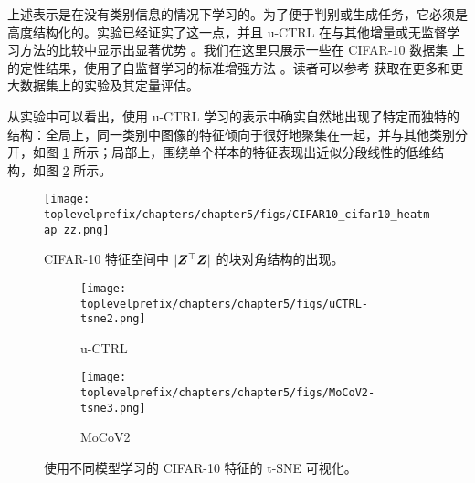 \documentclass[../../book-main.tex]{subfiles}
\begin{document}
上述表示是在没有类别信息的情况下学习的。为了便于判别或生成任务，它必须是高度结构化的。实验已经证实了这一点，并且 u-CTRL 在与其他增量或无监督学习方法的比较中显示出显著优势 \cite{pmlr-v234-tong24a}。我们在这里只展示一些在 CIFAR-10 数据集 \cite{krizhevsky2014cifar} 上的定性结果，使用了自监督学习的标准增强方法 \cite{chen2020simple}。读者可以参考 \cite{pmlr-v234-tong24a} 获取在更多和更大数据集上的实验及其定量评估。

从实验中可以看出，使用 u-CTRL 学习的表示中确实自然地出现了特定而独特的结构：全局上，同一类别中图像的特征倾向于很好地聚集在一起，并与其他类别分开，如图 \ref{fig:heatmap_z} 所示；局部上，围绕单个样本的特征表现出近似分段线性的低维结构，如图 \ref{fig:tsne} 所示。

\begin{figure}[t]
     \footnotesize
     \centering
    \texttt{[image: \\toplevelprefix/chapters/chapter5/figs/CIFAR10\_cifar10\_heatmap\_zz.png]}
    \caption{\small CIFAR-10 特征空间中 $|\bm{Z}^\top \bm{Z}|$ 的块对角结构的出现。}
    \label{fig:heatmap_z}
\end{figure}

\begin{figure}[h!]
    \begin{subfigure}[t]{0.46\textwidth}
        \centering
        \texttt{[image: \\toplevelprefix/chapters/chapter5/figs/uCTRL-tsne2.png]}
        \caption{u-CTRL}
    \end{subfigure}
    \hfill
    \begin{subfigure}[t]{0.46\textwidth}
        \centering
        \texttt{[image: \\toplevelprefix/chapters/chapter5/figs/MoCoV2-tsne3.png]}
        \caption{MoCoV2}
    \end{subfigure}
    \caption{\small 使用不同模型学习的 CIFAR-10 特征的 t-SNE 可视化。} 
    \label{fig:tsne}
\end{figure}
\end{document}

